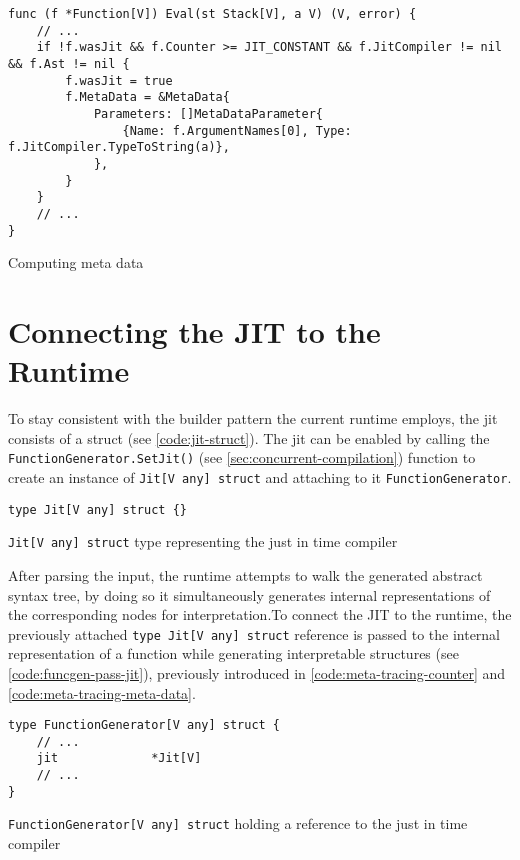 \begin{listing}[H]
    \begin{verbatim}
func (f *Function[V]) Eval(st Stack[V], a V) (V, error) {
    // ...
    if !f.wasJit && f.Counter >= JIT_CONSTANT && f.JitCompiler != nil && f.Ast != nil {
        f.wasJit = true
        f.MetaData = &MetaData{
            Parameters: []MetaDataParameter{
                {Name: f.ArgumentNames[0], Type: f.JitCompiler.TypeToString(a)},
            },
        }
    }
    // ...
}
    \end{verbatim}
    \caption{Computing meta data}
    \label{code:meta-tracing-adding-meta-data}
\end{listing}

\section{Connecting the JIT to the Runtime}

To stay consistent with the builder pattern the current runtime employs, the
jit consists of a struct (see \autoref{code:jit-struct}). The jit can be
enabled by calling the \texttt{FunctionGenerator.SetJit()} (see
\autoref{sec:concurrent-compilation}) function to create an instance of
\texttt{Jit[V any] struct} and attaching to it
\texttt{FunctionGenerator}. 

\begin{listing}[H]
    \begin{verbatim}
type Jit[V any] struct {}
    \end{verbatim}
    \caption{\texttt{Jit[V any] struct} type representing the just in time compiler}
    \label{code:jit-struct}
\end{listing}

After parsing the input, the runtime attempts to walk the
generated abstract syntax tree, by doing so it simultaneously generates
internal representations of the corresponding nodes for interpretation.To
connect the JIT to the runtime, the previously attached \texttt{type Jit[V any] struct} reference is passed to the internal representation of a
function while generating interpretable structures (see \autoref{code:funcgen-pass-jit}), previously introduced in
\autoref{code:meta-tracing-counter} and
\autoref{code:meta-tracing-meta-data}.

\begin{listing}[H]
    \begin{verbatim}
type FunctionGenerator[V any] struct {
    // ...
    jit             *Jit[V]
    // ...
}
    \end{verbatim}
    \caption{\texttt{FunctionGenerator[V any] struct} holding a reference to the just in time compiler}
    \label{code:funcgen-ref-jit}
\end{listing}

